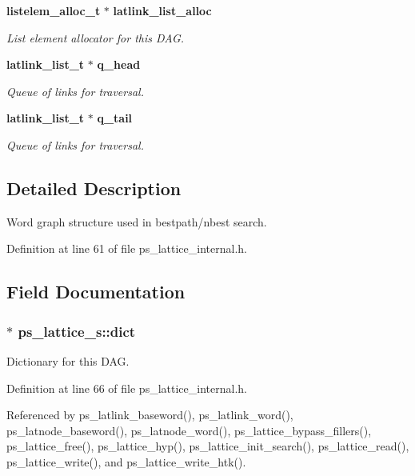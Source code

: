 \begin{DoxyCompactItemize}
{\bf listelem\-\_\-alloc\-\_\-t} $\ast$ {\bf latlink\-\_\-list\-\_\-alloc}
\begin{DoxyCompactList}\small\item\em List element allocator for this D\-A\-G. \end{DoxyCompactList}\item 
{\bf latlink\-\_\-list\-\_\-t} $\ast$ {\bf q\-\_\-head}
\begin{DoxyCompactList}\small\item\em Queue of links for traversal. \end{DoxyCompactList}\item 
{\bf latlink\-\_\-list\-\_\-t} $\ast$ {\bf q\-\_\-tail}
\begin{DoxyCompactList}\small\item\em Queue of links for traversal. \end{DoxyCompactList}\end{DoxyCompactItemize}


\subsection{Detailed Description}
Word graph structure used in bestpath/nbest search. 

Definition at line 61 of file ps\-\_\-lattice\-\_\-internal.\-h.



\subsection{Field Documentation}
\subsubsection[{dict}]{$\ast$ ps\-\_\-lattice\-\_\-s\-::dict}\label{structps__lattice__s_a71865c59fae65743ef3c6b5aceb17da6}


Dictionary for this D\-A\-G. 



Definition at line 66 of file ps\-\_\-lattice\-\_\-internal.\-h.



Referenced by ps\-\_\-latlink\-\_\-baseword(), ps\-\_\-latlink\-\_\-word(), ps\-\_\-latnode\-\_\-baseword(), ps\-\_\-latnode\-\_\-word(), ps\-\_\-lattice\-\_\-bypass\-\_\-fillers(), ps\-\_\-lattice\-\_\-free(), ps\-\_\-lattice\-\_\-hyp(), ps\-\_\-lattice\-\_\-init\-\_\-search(), ps\-\_\-lattice\-\_\-read(), ps\-\_\-lattice\-\_\-write(), and ps\-\_\-lattice\-\_\-write\-\_\-htk().

